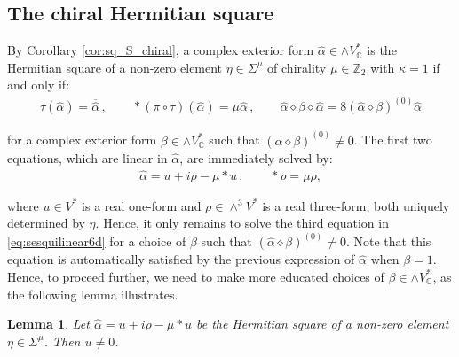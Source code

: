 \documentclass[10pt,a4paper,twoside,reqno]{amsart}
\theoremstyle{plain}
\newtheorem{lemma}[thm]{Lemma}
\theoremstyle{definition}
\theoremstyle{remark}
\def\C{\mathbb{C}}
\begin{document}

\subsection{The chiral Hermitian square}


By Corollary \ref{cor:sq_S_chiral}, a complex exterior form $\widehat{\alpha} \in \wedge V^{\ast}_{\C}$ is the Hermitian square of a non-zero element $\eta\in\Sigma^{\mu}$ of chirality $\mu\in\mathbb{Z}_2$ with $\kappa = 1$ if and only if:
\begin{eqnarray}
\label{eq:sesquilinear6d}
\tau(\widehat{\alpha})=\overline{\widehat{\alpha}}\, ,\qquad   \ast (\pi\circ\tau)(\widehat{\alpha}) =   \mu\widehat{\alpha}\, , \qquad \widehat{\alpha} \diamond \beta \diamond\widehat{\alpha}= 8 (\widehat{\alpha}\diamond\beta)^{(0)}\widehat{\alpha}
\end{eqnarray}

\noindent
for a complex exterior form $\beta\in \wedge V^{\ast}_{\C}$ such that $(\widehat{\alpha} \diamond\beta)^{(0)} \neq 0$. The first two equations, which are linear in $\widehat{\alpha}$, are immediately solved by:
\begin{eqnarray*}
\widehat{\alpha} = u + i \rho  - \mu \ast u\, , \qquad \ast \rho = \mu \rho,
\end{eqnarray*}

\noindent
where $u\in V^{\ast}$ is a real one-form and $\rho\in \wedge^3 V^{\ast}$ is a real three-form, both uniquely determined by $\eta$. Hence, it only remains to solve the third equation in \eqref{eq:sesquilinear6d} for a choice of $\beta$ such that $(\widehat{\alpha} \diamond\beta)^{(0)} \neq 0$. Note that this equation is automatically satisfied by the previous expression of $\widehat{\alpha}$ when $\beta = 1$. Hence, to proceed further, we need to make more educated choices of $\beta \in \wedge V^{\ast}_{\C}$, as the following lemma illustrates. 

\begin{lemma}
Let $\widehat{\alpha} = u + i \rho  - \mu \ast u$ be the Hermitian square of a non-zero element $\eta\in \Sigma^{\mu}$. Then $u\neq 0$.
\end{lemma}
\end{document}
